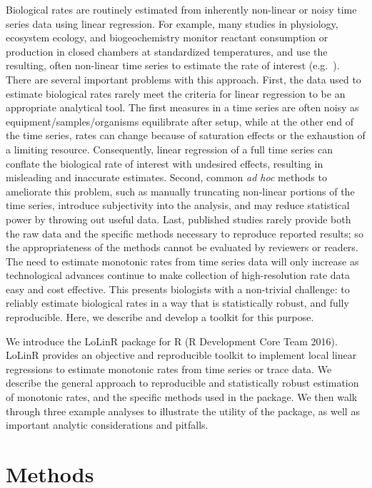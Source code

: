 \documentclass[11pt]{article}
\newcommand{\code}{\fontfamily{pcr}\selectfont}
\begin{document}
Biological rates are routinely estimated from inherently non-linear or noisy time series data using linear regression. For example, many studies in physiology, ecosystem ecology, and biogeochemistry monitor reactant consumption or production in closed chambers at standardized temperatures, and use the resulting, often non-linear time series to estimate the rate of interest (e.g.~\citealt{Song2011, WhiteMarshall2011, Larmola2013, RossKeough2013, Tanaka2013, YvonDurocher2015}). There are several important problems with this approach. First, the data used to estimate biological rates rarely meet the criteria for linear regression to be an appropriate analytical tool. The first measures in a time series are often noisy as equipment/samples/organisms equilibrate after setup, while at the other end of the time series, rates can change because of saturation effects or the exhaustion of a limiting resource. Consequently, linear regression of a full time series can conflate the biological rate of interest with undesired effects, resulting in misleading and inaccurate estimates. Second, common \textit{ad hoc} methods to ameliorate this problem, such as manually truncating non-linear portions of the time series, introduce subjectivity into the analysis, and may reduce statistical power by throwing out useful data. Last, published studies rarely provide both the raw data and the specific methods necessary to reproduce reported results; so the appropriateness of the methods cannot be evaluated by reviewers or readers. The need to estimate monotonic rates from time series data will only increase as technological advances continue to make collection of high-resolution rate data easy and cost effective. This presents biologists with a non-trivial challenge: to reliably estimate biological rates in a way that is statistically robust, and fully reproducible. Here, we describe and develop a toolkit for this purpose.

We introduce the {\code LoLinR} package for R (R Development Core Team 2016). {\code LoLinR} provides an objective and reproducible toolkit to implement local linear regressions to estimate monotonic rates from time series or trace data. We describe the general approach to reproducible and statistically robust estimation of monotonic rates, and the specific methods used in the package. We then walk through three example analyses to illustrate the utility of the package, as well as important analytic considerations and pitfalls.

\section*{Methods}
\end{document}
